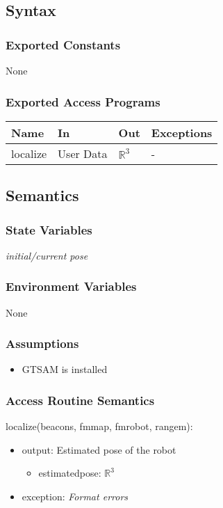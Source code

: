 \documentclass[12pt, titlepage]{article}
\begin{document}
\subsection{Syntax}

\subsubsection{Exported Constants}
None

\subsubsection{Exported Access Programs}

\begin{center}
\begin{tabular}{p{2cm} p{4cm} p{4cm} p{2cm}}
\hline
\textbf{Name} & \textbf{In} & \textbf{Out} & \textbf{Exceptions} \\
\hline
localize & User Data & $\mathbb{R}^3$ & - \\
\hline
\end{tabular}
\end{center}

\subsection{Semantics}

\subsubsection{State Variables}
\textit{initial/current pose}

\subsubsection{Environment Variables}
None

\subsubsection{Assumptions}
\begin{itemize}
  \item GTSAM is installed
\end{itemize}

\subsubsection{Access Routine Semantics}

\noindent localize(beacons, fm\textunderscore map, fm\textunderscore robot, range\textunderscore m):
\begin{itemize}
\item output: Estimated pose of the robot
\begin{itemize}
  \item estimated\textunderscore pose: $\mathbb{R}^3$ 
\end{itemize}
\item exception: \textit{Format errors}
\end{itemize}
\end{document}
